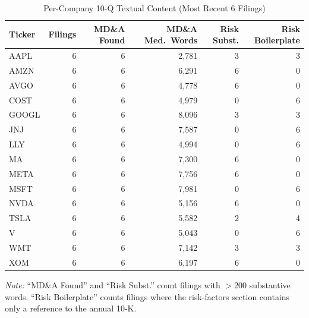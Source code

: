 \begin{table}[htbp]
\centering
\caption{Per-Company 10-Q Textual Content (Most Recent 6 Filings)}
\label{tab:text_per_company}
\small
\begin{tabular}{lrrrrr}
\toprule
Ticker & Filings & MD\&A Found & MD\&A Med.\ Words & Risk Subst. & Risk Boilerplate \\
\midrule
AAPL & 6 & 6 & 2,781 & 3 & 3 \\
AMZN & 6 & 6 & 6,291 & 6 & 0 \\
AVGO & 6 & 6 & 4,778 & 6 & 0 \\
COST & 6 & 6 & 4,979 & 0 & 6 \\
GOOGL & 6 & 6 & 8,096 & 3 & 3 \\
JNJ & 6 & 6 & 7,587 & 0 & 6 \\
LLY & 6 & 6 & 4,994 & 0 & 6 \\
MA & 6 & 6 & 7,300 & 6 & 0 \\
META & 6 & 6 & 7,756 & 6 & 0 \\
MSFT & 6 & 6 & 7,981 & 0 & 6 \\
NVDA & 6 & 6 & 5,156 & 6 & 0 \\
TSLA & 6 & 6 & 5,582 & 2 & 4 \\
V & 6 & 6 & 5,043 & 0 & 6 \\
WMT & 6 & 6 & 7,142 & 3 & 3 \\
XOM & 6 & 6 & 6,197 & 6 & 0 \\
\bottomrule
\end{tabular}
\begin{tablenotes}
\small
\item \textit{Note:} ``MD\&A Found'' and ``Risk Subst.'' count filings with $>$200
substantive words. ``Risk Boilerplate'' counts filings where the risk-factors section
contains only a reference to the annual 10-K.
\end{tablenotes}
\end{table}
